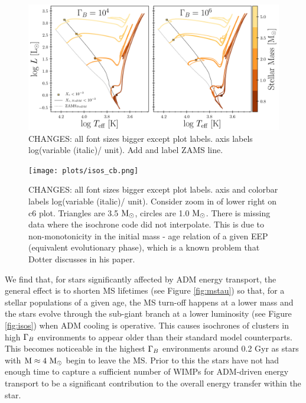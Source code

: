 \documentclass[useAMS,usenatbib]{mnras}
\begin{document}
  \begin{figure}
    \centering
    \includegraphics[width=\textwidth]{plots/tracks.png}
    \caption{CHANGES: all font sizes bigger except plot labels. axis labels log(variable (italic)/ unit). Add and label ZAMS line.}
    \label{fig:tracks}

  \end{figure}

  \begin{figure}
    \centering
    \texttt{[image: plots/isos\_cb.png]}
    \caption{CHANGES: all font sizes bigger except plot labels. axis and colorbar labels log(variable (italic)/ unit). Consider zoom in of lower right on c6 plot. Triangles are 3.5$\ \mathrm{M}_{\odot}$, circles are 1.0$\ \mathrm{M}_{\odot}$. There is missing data where the isochrone code did not interpolate. This is due to non-monotonicity in the initial mass - age relation of a given EEP (equivalent evolutionary phase), which is a known problem that Dotter discusses in his paper.}
    \label{fig:isos_cb}
  \end{figure}


   We find that, for stars significantly affected by ADM energy transport, the general effect is to shorten MS lifetimes (see Figure \ref{fig:mstau}) so that, for a stellar populations of a given age, the MS turn-off happens at a lower mass and the stars evolve through the sub-giant branch at a lower luminosity (see Figure \ref{fig:isos}) when ADM cooling is operative. This causes isochrones of clusters in high $\Gamma_B$ environments to appear older than their standard model counterparts. This becomes noticeable in the highest $\Gamma_B$ environments around 0.2 Gyr as stars with $\rm{M} \approx 4 \ \mathrm{M}_{\odot}$ begin to leave the MS. Prior to this the stars have not had enough time to capture a sufficient number of WIMPs for ADM-driven energy transport to be a significant contribution to the overall energy transfer within the star.
\end{document}
